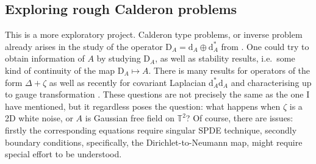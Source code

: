 \documentclass[12pt]{article}
\numberwithin{equation}{section}
\theoremstyle{definition}
\theoremstyle{remark}
\newcommand{\diff}{\mathrm{d}}
\newcommand{\1}{\mathbf 1}
\newcommand{\<}{\langle}
\renewcommand{\>}{\rangle}
\newcommand{\rmD}{\mathrm{D}}
\begin{document}
\subsection{Exploring rough Calderon problems}
This is a more exploratory project. Calderon type problems, or inverse problem already arises in the study of the operator $\rmD_A=\diff_A\oplus\diff_A^*$ from . One could try to obtain information of $A$ by studying $\rmD_A$, as well as stability results, i.e.\ some kind of continuity of the map $\rmD_A\mapsto A$. There is many results for operators of the form $\Delta+\zeta$ as well as recently for covariant Laplacian $\diff_A^*\diff_A$ and characterising up to gauge transformation \cite{Cekic20}. These questions are not precisely the same as the one I have mentioned, but it regardless poses the question: what happens when $\zeta$ is a 2D white noise, or $A$ is Gaussian free field on $\mathbb T^2$? Of course, there are issues: firstly the corresponding equations require singular SPDE technique, secondly boundary conditions, specifically, the Dirichlet-to-Neumann map, might require special effort to be understood. 












\end{document}
